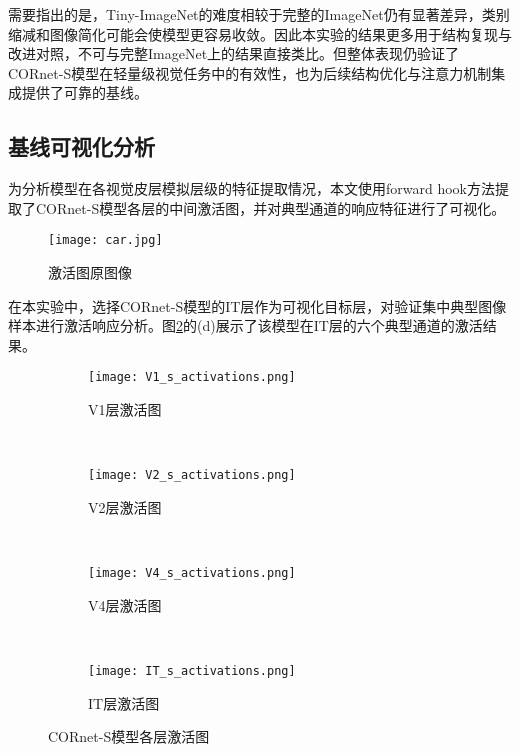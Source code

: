 需要指出的是，Tiny-ImageNet的难度相较于完整的ImageNet仍有显著差异，类别缩减和图像简化可能会使模型更容易收敛。因此本实验的结果更多用于结构复现与改进对照，不可与完整ImageNet上的结果直接类比。但整体表现仍验证了CORnet-S模型在轻量级视觉任务中的有效性，也为后续结构优化与注意力机制集成提供了可靠的基线。

\subsection{基线可视化分析}

为分析模型在各视觉皮层模拟层级的特征提取情况，本文使用forward hook方法提取了CORnet-S模型各层的中间激活图，并对典型通道的响应特征进行了可视化。

\begin{figure}[hbt]
	\centering
	\texttt{[image: car.jpg]}
	\caption{激活图原图像}
	\label{f.car}
\end{figure}


在本实验中，选择CORnet-S模型的IT层作为可视化目标层，对验证集中典型图像样本进行激活响应分析。图\ref{f.cornet_s_jihuo}的(d)展示了该模型在IT层的六个典型通道的激活结果。

\begin{figure}[!htb]
	\centering
	\begin{subfigure}[t]{0.8\linewidth}
		\captionsetup{justification=centering}
		\begin{minipage}[b]{1\linewidth}
			\texttt{[image: V1\_s\_activations.png]}
			\caption{V1层激活图}
		\end{minipage}
	\end{subfigure}\\
	\begin{subfigure}[t]{0.8\linewidth}
		\captionsetup{justification=centering}
		\begin{minipage}[b]{1\linewidth}
			\texttt{[image: V2\_s\_activations.png]}
			\caption{V2层激活图}
		\end{minipage}
	\end{subfigure}\\
	\begin{subfigure}[t]{0.8\linewidth}
		\captionsetup{justification=centering}
		\begin{minipage}[b]{1\linewidth}
			\texttt{[image: V4\_s\_activations.png]}
			\caption{V4层激活图}
		\end{minipage}
	\end{subfigure}\\
	\begin{subfigure}[t]{0.8\linewidth}
		\captionsetup{justification=centering}
		\begin{minipage}[b]{1\linewidth}
			\texttt{[image: IT\_s\_activations.png]}
			\caption{IT层激活图}
		\end{minipage}
	\end{subfigure}
	\caption{CORnet-S模型各层激活图}
	\label{f.cornet_s_jihuo}
\end{figure}

